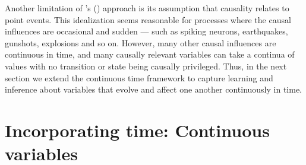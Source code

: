 \documentclass{cambridge7A}%
\def\citeapos#1{\citeauthor{#1}'s (\citeyear{#1})}
\begin{document}
Another limitation of \citeapos{bramley2018time} approach is its assumption that causality relates to point events.  This idealization seems reasonable for processes where the causal influences are occasional and sudden --- such as spiking neurons, earthquakes, gunshots, explosions and so on.  However, many other causal influences are continuous in time, and many causally relevant variables can take a continua of values with no transition or state being causally privileged.  Thus, in the next section we extend the continuous time framework to capture learning and inference about variables that evolve and affect one another continuously in time.

\section{Incorporating time: Continuous variables}\label{section:ctcv}
\end{document}
